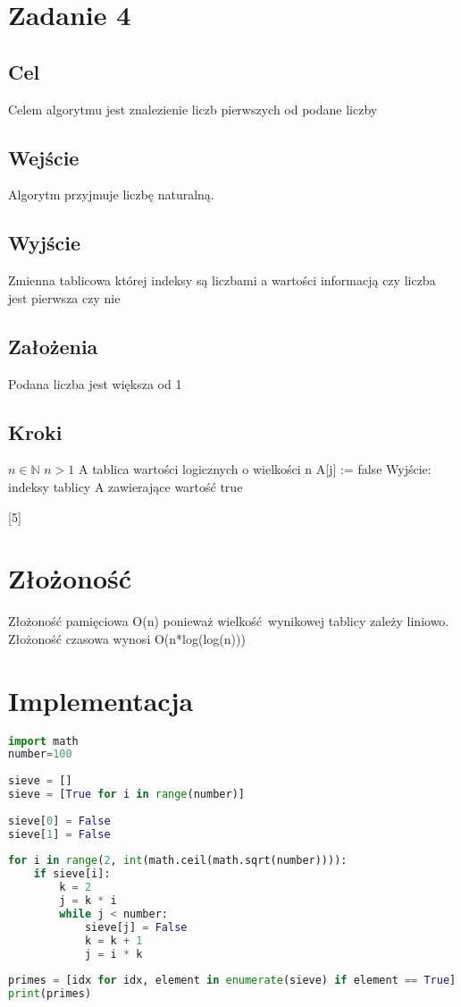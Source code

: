 \documentclass{article}
\begin{document}
		\section{Zadanie 4}
			\subsection{Cel}
			Celem algorytmu jest znalezienie liczb pierwszych od podane liczby
			\subsection{Wejście}
			Algorytm przyjmuje liczbę naturalną.
			\subsection{Wyjście}
			Zmienna tablicowa której indeksy są liczbami a wartości informacją czy liczba jest pierwsza czy nie
			\subsection{Założenia}
			Podana liczba jest większa od 1
			\subsection{Kroki}
			\begin{algorithmic}[5]
				\Require $n \in  \mathbb{N}$
				\Ensure $n > 1$
				\State A tablica wartości logicznych o wielkości n
							\State A[j] := false
						\EndFor
					\EndIf
				\EndFor
				\State Wyjście: indeksy tablicy A zawierające wartość true
			\end{algorithmic}[5]
		\section{Złożoność}
			Złożoność pamięciowa O(n) ponieważ wielkość wynikowej tablicy zależy liniowo.
			Złożoność czasowa wynosi O(n*log(log(n)))
		\section{Implementacja}
			\begin{lstlisting}[language=Python, caption=implementacja sita Erostenesa]
import math
number=100
				
sieve = []
sieve = [True for i in range(number)]
				
sieve[0] = False
sieve[1] = False
				
for i in range(2, int(math.ceil(math.sqrt(number)))):
	if sieve[i]:
		k = 2
		j = k * i
		while j < number:
			sieve[j] = False
			k = k + 1
			j = i * k
				
primes = [idx for idx, element in enumerate(sieve) if element == True]
print(primes)
			\end{lstlisting}
\end{document}
